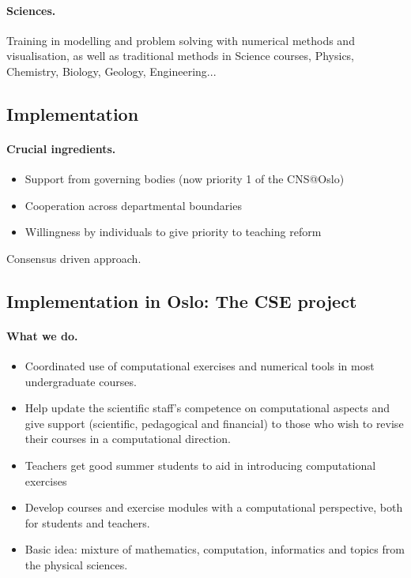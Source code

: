 \documentclass[%
twoside,                 %
final,                   %
10pt]{article}
\begin{document}
\paragraph{Sciences.}
Training in modelling and problem solving with numerical methods and visualisation, as well as traditional methods in Science courses, Physics, Chemistry, Biology, Geology, Engineering...





\subsection{Implementation}

\paragraph{Crucial ingredients.}

\begin{itemize}
\item Support from governing bodies (now priority 1 of the CNS@Oslo)

\item Cooperation across departmental boundaries

\item Willingness by individuals to give priority to teaching reform
\end{itemize}

\noindent
Consensus driven approach.





\subsection{Implementation in Oslo: The CSE  project}

\paragraph{What we do.}
\begin{itemize}
\item Coordinated use of computational exercises and numerical tools in most undergraduate courses.

\item Help update the scientific staff's competence on computational aspects and give support (scientific, pedagogical and financial)  to those who wish to revise  their courses in a computational direction.

\item Teachers get good summer students to aid in introducing computational exercises

\item Develop courses and exercise modules with a computational perspective, both for students and teachers. 

\item Basic idea: mixture of mathematics, computation, informatics and topics from the physical sciences.
\end{itemize}
\end{document}
